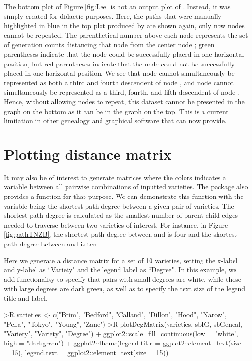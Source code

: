 \documentclass[article,shortnames]{jss}
\begin{document}
The bottom plot of Figure \ref{fig:Lee} is not an output plot of . Instead, it was simply created for didactic purposes. Here, the paths that were manually highlighted in blue in the top plot produced by  are shown again, only now nodes cannot be repeated. The parenthetical number above each node represents the set of generation counts distancing that node from the center node ; green parentheses indicate that the node could be successfully placed in one horizontal position, but red parentheses indicate that the node could not be successfully placed in one horizontal position. We see that node  cannot simultaneously be represented as both a third and fourth descendent of node , and node  cannot simultaneously be represented as a third, fourth, and fifth descendent of node . Hence, without allowing nodes to repeat, this dataset cannot be presented in the graph on the bottom as it can be in the  graph on the top. This is a current limitation in other genealogy and graphical software that  can now provide.

\section{Plotting distance matrix}
\label{pdm}

It may also be of interest to generate matrices where the colors indicates a variable between all pairwise combinations of inputted varieties. The package  also provides a function  for that purpose. We can demonstrate this function with the variable being the shortest path degree between a given pair of varieties. The shortest path degree is calculated as the smallest number of parent-child edges needed to traverse between two varieties of interest. For instance, in Figure \ref{fig:pathTNZB}, the shortest path degree between  and  is four and the shortest path degree between  and  is ten.

Here we generate a distance matrix for a set of 10 varieties, setting the x-label and y-label as ``Variety" and the legend label as ``Degree". In this example, we add  functionality to specify that pairs with small degrees are white, while those with large degrees are dark green, as well as to specify the text size of the legend title and label.

\begin{Code}
>R varieties <- c("Brim", "Bedford", "Calland", "Dillon", "Hood", "Narow",
  "Pella", "Tokyo", "Young", "Zane")
>R plotDegMatrix(varieties, sbIG, sbGeneal, "Variety", "Variety", "Degree") +
  ggplot2::scale_fill_continuous(low = "white", high = "darkgreen") +
  ggplot2::theme(legend.title = ggplot2::element_text(size = 15), legend.text
  = ggplot2::element_text(size = 15))
\end{Code}
\end{document}
